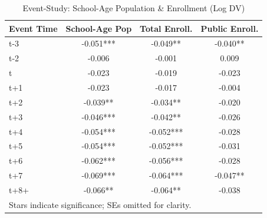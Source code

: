 \begin{table}[htbp]\centering
\scriptsize
\caption{Event-Study: School-Age Population \& Enrollment (Log DV)}
\begin{tabular}{lccc}
\hline\hline
Event Time & School-Age Pop & Total Enroll. & Public Enroll. \\
\hline
t-3   & -0.051*** & -0.049**  & -0.040**  \\
t-2   & -0.006    & -0.001    &  0.009    \\
t     & -0.023    & -0.019    & -0.023    \\
t+1   & -0.023    & -0.017    & -0.004    \\
t+2   & -0.039**  & -0.034**  & -0.020    \\
t+3   & -0.046*** & -0.042**  & -0.026    \\
t+4   & -0.054*** & -0.052*** & -0.028    \\
t+5   & -0.054*** & -0.052*** & -0.031    \\
t+6   & -0.062*** & -0.056*** & -0.028    \\
t+7   & -0.069*** & -0.064*** & -0.047**  \\
t+8+  & -0.066**  & -0.064**  & -0.038    \\
\hline\hline
\multicolumn{4}{l}{\footnotesize Stars indicate significance; SEs omitted for clarity.}\\
\end{tabular}
\end{table}
